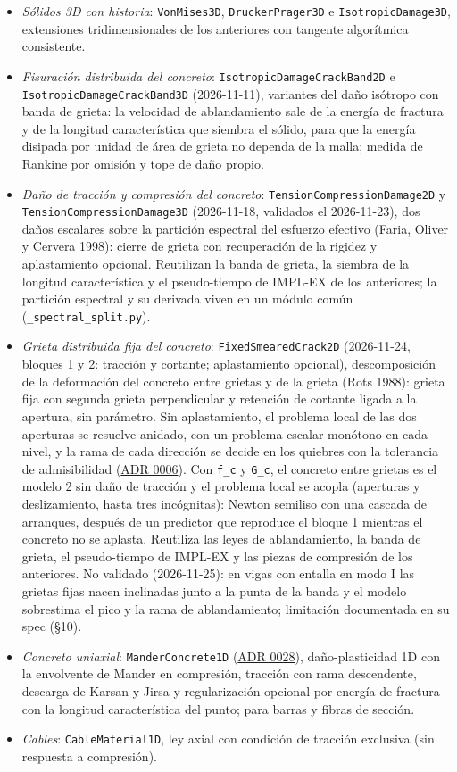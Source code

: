 \documentclass[11pt,oneside]{report}
\begin{document}
\begin{itemize}
  \item \textit{Sólidos 3D con historia}: \texttt{VonMises3D}, \texttt{DruckerPrager3D} e \texttt{IsotropicDamage3D}, extensiones tridimensionales de los anteriores con tangente algorítmica consistente.
  \item \textit{Fisuración distribuida del concreto}: \texttt{IsotropicDamageCrackBand2D} e \texttt{IsotropicDamageCrackBand3D} (2026-11-11), variantes del daño isótropo con banda de grieta: la velocidad de ablandamiento sale de la energía de fractura y de la longitud característica que siembra el sólido, para que la energía disipada por unidad de área de grieta no dependa de la malla; medida de Rankine por omisión y tope de daño propio.
  \item \textit{Daño de tracción y compresión del concreto}: \texttt{TensionCompressionDamage2D} y \texttt{TensionCompressionDamage3D} (2026-11-18, validados el 2026-11-23), dos daños escalares sobre la partición espectral del esfuerzo efectivo (Faria, Oliver y Cervera 1998): cierre de grieta con recuperación de la rigidez y aplastamiento opcional. Reutilizan la banda de grieta, la siembra de la longitud característica y el pseudo-tiempo de IMPL-EX de los anteriores; la partición espectral y su derivada viven en un módulo común (\texttt{\_\allowbreak{}spectral\_\allowbreak{}split.\allowbreak{}py}).
  \item \textit{Grieta distribuida fija del concreto}: \texttt{FixedSmearedCrack2D} (2026-11-24, bloques 1 y 2: tracción y cortante; aplastamiento opcional), descomposición de la deformación del concreto entre grietas y de la grieta (Rots 1988): grieta fija con segunda grieta perpendicular y retención de cortante ligada a la apertura, sin parámetro. Sin aplastamiento, el problema local de las dos aperturas se resuelve anidado, con un problema escalar monótono en cada nivel, y la rama de cada dirección se decide en los quiebres con la tolerancia de admisibilidad (\hyperref[adr:0006]{ADR 0006}). Con \texttt{f\_c} y \texttt{G\_c}, el concreto entre grietas es el modelo 2 sin daño de tracción y el problema local se acopla (aperturas y deslizamiento, hasta tres incógnitas): Newton semiliso con una cascada de arranques, después de un predictor que reproduce el bloque 1 mientras el concreto no se aplasta. Reutiliza las leyes de ablandamiento, la banda de grieta, el pseudo-tiempo de IMPL-EX y las piezas de compresión de los anteriores. No validado (2026-11-25): en vigas con entalla en modo I las grietas fijas nacen inclinadas junto a la punta de la banda y el modelo sobrestima el pico y la rama de ablandamiento; limitación documentada en su spec (§10).
  \item \textit{Concreto uniaxial}: \texttt{ManderConcrete1D} (\hyperref[adr:0028]{ADR 0028}), daño-plasticidad 1D con la envolvente de Mander en compresión, tracción con rama descendente, descarga de Karsan y Jirsa y regularización opcional por energía de fractura con la longitud característica del punto; para barras y fibras de sección.
  \item \textit{Cables}: \texttt{CableMaterial1D}, ley axial con condición de tracción exclusiva (sin respuesta a compresión).
\end{itemize}
\end{document}
